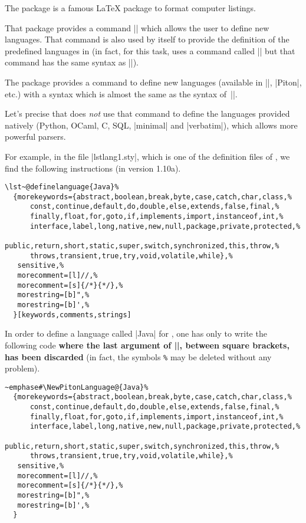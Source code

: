 \documentclass{article}
\begin{document}
\label{NewPitonLanguage}

\medskip
The package  is a famous LaTeX package to format computer
listings.

That package provides a command |\lstdefinelanguage| which allows the user to
define new languages. That command is also used by  itself to
provide the definition of the predefined languages in  (in fact,
for this task,  uses a command called |\lst@definelanguage| but
that command has the same syntax as |\lstdefinelanguage|). 

\medskip
The package  provides a command
 to define new languages (available in
|\piton|, |{Piton}|, etc.) with a syntax which is almost the same as the
syntax of~|\lstdefinelanguage|.

Let's precise that  does \emph{not} use that command to define the
languages provided natively (Python, OCaml, C, SQL, |minimal| and |verbatim|),
which allows more powerful parsers.

\medskip
For example, in the file |lstlang1.sty|, which is one of the definition files
of , we find the following instructions (in version 1.10a).

\begin{small}
\begin{Verbatim}
\lst~@definelanguage{Java}%
  {morekeywords={abstract,boolean,break,byte,case,catch,char,class,%
      const,continue,default,do,double,else,extends,false,final,%
      finally,float,for,goto,if,implements,import,instanceof,int,%
      interface,label,long,native,new,null,package,private,protected,%
      public,return,short,static,super,switch,synchronized,this,throw,%
      throws,transient,true,try,void,volatile,while},%
   sensitive,%
   morecomment=[l]//,%
   morecomment=[s]{/*}{*/},%
   morestring=[b]",%
   morestring=[b]',%
  }[keywords,comments,strings]
\end{Verbatim}
\end{small}

\medskip
In order to define a language called |Java| for , one has only to
write the following code {\bfseries where the last argument of
|\lst@definelanguage|, between square brackets, has been discarded} (in fact,
the symbols \verb+%+ may be deleted without any problem).

\begin{small}
\begin{Verbatim}
~emphase#\NewPitonLanguage@{Java}%
  {morekeywords={abstract,boolean,break,byte,case,catch,char,class,%
      const,continue,default,do,double,else,extends,false,final,%
      finally,float,for,goto,if,implements,import,instanceof,int,%
      interface,label,long,native,new,null,package,private,protected,%
      public,return,short,static,super,switch,synchronized,this,throw,%
      throws,transient,true,try,void,volatile,while},%
   sensitive,%
   morecomment=[l]//,%
   morecomment=[s]{/*}{*/},%
   morestring=[b]",%
   morestring=[b]',%
  }
\end{Verbatim}
\end{small}
\end{document}
